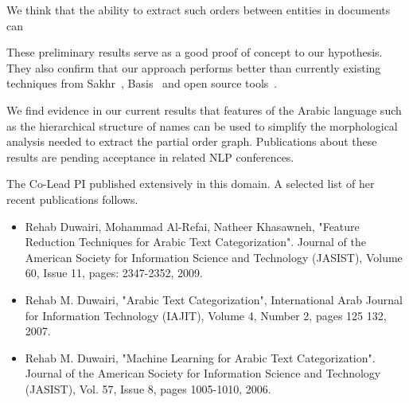 \documentclass[12pt]{article}
\begin{document}
We think that the ability to extract such orders
between entities in documents can 



These preliminary results serve as a good proof of concept to our 
hypothesis. They also confirm that our approach performs better than 
currently existing techniques from Sakhr~\cite{Sak09},
Basis~\cite{Bas09} and open source 
tools~\cite{Col09,Otakar:07,Tim04}.

We find evidence in our current results that features 
of the Arabic language such as the hierarchical structure of
names can be used to simplify the morphological analysis
needed to extract the partial order graph. 
Publications about these results are pending acceptance in 
related NLP conferences. 

The Co-Lead PI published extensively in this domain. 
A selected list of her recent publications follows. 
\begin{itemize}\itemsep0pt
\item Rehab Duwairi, Mohammad Al-Refai, Natheer Khasawneh, 
"Feature Reduction Techniques for Arabic Text Categorization". 
Journal of the American Society for Information Science and Technology 
(JASIST), Volume 60, Issue 11, pages: 2347-2352, 2009. 
\item Rehab M. Duwairi, "Arabic Text Categorization", 
International Arab Journal for Information Technology (IAJIT), 
Volume 4, Number 2, pages 125  132, 2007.
\item Rehab M. Duwairi, "Machine Learning for Arabic Text Categorization". 
Journal of the American Society for Information Science and Technology 
(JASIST), Vol. 57, Issue 8, pages 1005-1010, 2006.
\end{itemize}


\end{document}
